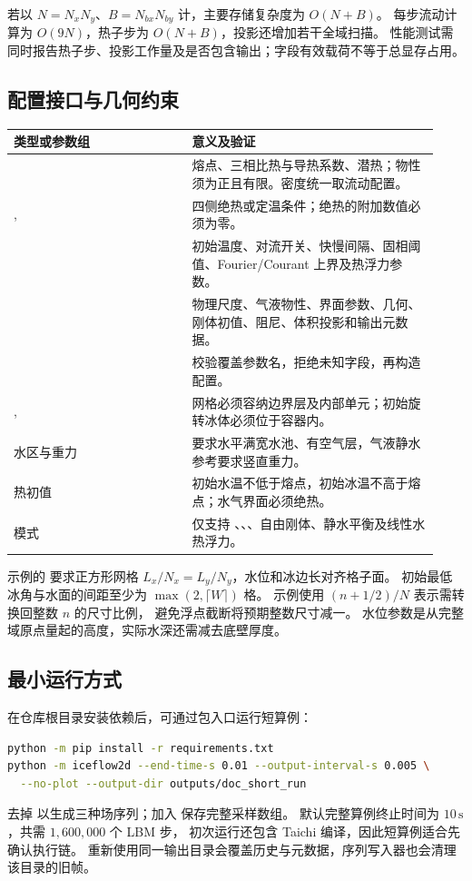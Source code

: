 若以 $N=N_xN_y$、$B=N_{bx}N_{by}$ 计，主要存储复杂度为 $O(N+B)$。
每步流动计算为 $O(9N)$，热子步为 $O(N+B)$，投影还增加若干全域扫描。
性能测试需同时报告热子步、投影工作量及是否包含输出；字段有效载荷不等于总显存占用。

\subsection{配置接口与几何约束}
\begin{longtable}{L{0.39\linewidth}L{0.54\linewidth}}
\toprule 类型或参数组 & 意义及验证\\\midrule
\endhead
{} & 熔点、三相比热与导热系数、潜热；物性须为正且有限。密度统一取流动配置。\\
,  & 四侧绝热或定温条件；绝热的附加数值必须为零。\\
 & 初始温度、对流开关、快慢间隔、固相阈值、Fourier/Courant 上界及热浮力参数。\\
 & 物理尺度、气液物性、界面参数、几何、刚体初值、阻尼、体积投影和输出元数据。\\
 & 校验覆盖参数名，拒绝未知字段，再构造配置。\\
,  & 网格必须容纳边界层及内部单元；初始旋转冰体必须位于容器内。\\
水区与重力 & 要求水平满宽水池、有空气层，气液静水参考要求竖直重力。\\
热初值 & 初始水温不低于熔点，初始冰温不高于熔点；水气界面必须绝热。\\
模式 & 仅支持 、、、自由刚体、静水平衡及线性水热浮力。\\
\bottomrule
\end{longtable}
示例的  要求正方形网格
$L_x/N_x=L_y/N_y$，水位和冰边长对齐格子面。
初始最低冰角与水面的间距至少为 $\max(2,\lceil W\rceil)$ 格。
示例使用 $(n+1/2)/N$ 表示需转换回整数 $n$ 的尺寸比例，
避免浮点截断将预期整数尺寸减一。
水位参数是从完整域原点量起的高度，实际水深还需减去底壁厚度。

\subsection{最小运行方式}
在仓库根目录安装依赖后，可通过包入口运行短算例：
\begin{lstlisting}[language=bash]
python -m pip install -r requirements.txt
python -m iceflow2d --end-time-s 0.01 --output-interval-s 0.005 \
  --no-plot --output-dir outputs/doc_short_run
\end{lstlisting}
去掉  以生成三种场序列；加入  保存完整采样数组。
默认完整算例终止时间为 $10\,\mathrm s$，共需 $1{,}600{,}000$ 个 LBM 步，
初次运行还包含 Taichi 编译，因此短算例适合先确认执行链。
重新使用同一输出目录会覆盖历史与元数据，序列写入器也会清理该目录的旧帧。

